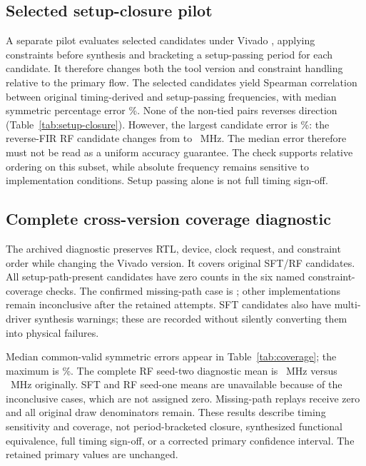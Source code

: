 \subsection{Selected setup-closure pilot}


A separate pilot evaluates  selected
candidates under Vivado , applying constraints
before synthesis and bracketing a setup-passing period for each candidate.
It therefore changes both the tool version and constraint handling relative
to the primary flow. The selected candidates yield Spearman correlation
 between original timing-derived and setup-passing
frequencies, with median symmetric percentage error
\%.  None of the
 non-tied pairs reverses direction
(Table~\ref{tab:setup-closure}).  However, the largest candidate error is
\%: the reverse-FIR RF candidate changes from
 to
~MHz.  The median error therefore must not be
read as a uniform accuracy guarantee.  The check supports relative ordering
on this subset, while absolute frequency remains sensitive to implementation
conditions.  Setup passing alone is not full timing sign-off.

\subsection{Complete cross-version coverage diagnostic}

The archived diagnostic preserves RTL, device, clock request, and constraint
order while changing the Vivado version. It covers
 original SFT/RF candidates. All
 setup-path-present candidates have zero counts in
the six named constraint-coverage checks. The confirmed missing-path case is
; 
other implementations remain inconclusive after the retained attempts.
 SFT candidates also have multi-driver
synthesis warnings; these are recorded without silently converting them into
physical failures.

Median common-valid symmetric errors appear in Table~\ref{tab:coverage}; the
maximum is \%. The complete RF seed-two
diagnostic mean is ~MHz versus
~MHz originally. SFT and RF seed-one means
are unavailable because of the inconclusive cases, which are not assigned zero.
Missing-path replays receive zero and all original draw denominators remain.
These results describe timing sensitivity and coverage, not period-bracketed
closure, synthesized functional equivalence, full timing sign-off, or a corrected
primary confidence interval. The retained primary values are unchanged.
